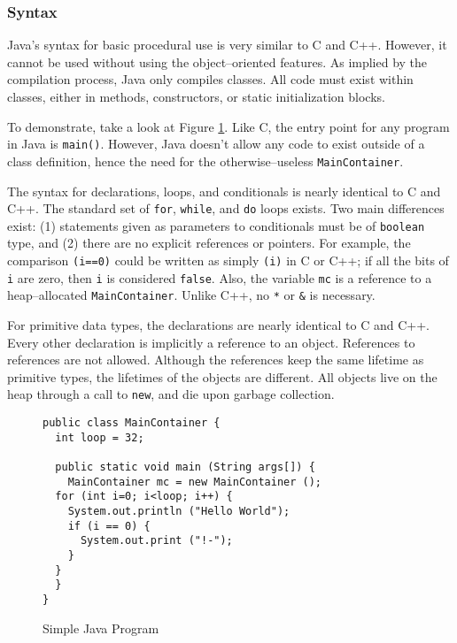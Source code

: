 
\subsubsection{Syntax}

Java's syntax for basic procedural use is very similar to C and C++. However,
it cannot be used without using the object--oriented features. As implied by
the compilation process, Java only compiles classes. All code must exist
within classes, either in methods, constructors, or static initialization
blocks.

To demonstrate, take a look at Figure \ref{fig:java-simple}. Like C, the entry
point for any program in Java is \texttt{main()}. However, Java doesn't allow
any code to exist outside of a class definition, hence the need for the
otherwise--useless \texttt{MainContainer}.

The syntax for declarations, loops, and conditionals is nearly identical to C
and C++. The standard set of \texttt{for}, \texttt{while}, and \texttt{do}
loops exists. Two main differences exist: (1) statements given as parameters
to conditionals must be of \texttt{boolean} type, and (2) there are no
explicit references or pointers. For example, the comparison \texttt{(i==0)}
could be written as simply \texttt{(i)} in C or C++; if all the bits of
\texttt{i} are zero, then \texttt{i} is considered \texttt{false}. Also, the
variable \texttt{mc} is a reference to a heap--allocated
\texttt{MainContainer}. Unlike C++, no \texttt{*} or \texttt{\&} is necessary.

For primitive data types, the declarations are nearly identical to C and C++.
Every other declaration is implicitly a reference to an object. References to
references are not allowed. Although the references keep the same lifetime as
primitive types, the lifetimes of the objects are different. All objects live
on the heap through a call to \texttt{new}, and die upon garbage collection.

\begin{figure}[ht!]
\begin{verbatim}
public class MainContainer {
  int loop = 32;
  
  public static void main (String args[]) {
    MainContainer mc = new MainContainer ();
  for (int i=0; i<loop; i++) {
    System.out.println ("Hello World");
    if (i == 0) {
      System.out.print ("!-");
    }
  }
  }
}
\end{verbatim}
\caption{Simple Java Program}
\label{fig:java-simple}
\end{figure}

